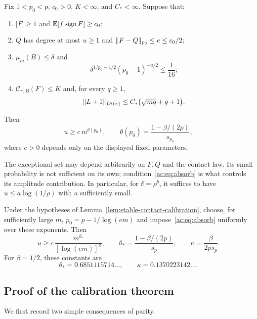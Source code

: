 \begin{lemma}\label{lem:stable-contact-calibration}
Fix $1<p_0<p$, $c_0>0$, $K<\infty$, and $C_*<\infty$. Suppose that:
\begin{enumerate}
\item $|F|\ge1$ and $\mathbb E[f\operatorname{sign} F]\ge c_0$;
\item $Q$ has degree at most $u\ge1$ and $\lVert F-Q\rVert_{p_0}\le e\le c_0/2$;
\item $\mu_m(B)\le\delta$ and
\begin{equation}\label{ac:eq:absorb}
 \delta^{1/p_0-1/2}(p_0-1)^{-u/2}\le\frac1{16};
\end{equation}
\item $\mathcal C_{\pi,B}(F)\le K$ and, for every $q\ge1$,
\begin{equation}\label{ac:eq:distance}
 \lVert L+1\rVert_{L^q(\pi)}\le C_*\bigl(\sqrt{mq}+q+1\bigr).
\end{equation}
\end{enumerate}
Then
\begin{equation}\label{ac:eq:theta}
 u\ge c\,m^{\theta(p_0)},\qquad
 \theta(p_0)=\frac{1-\beta/(2p)}{s_{p_0}},
\end{equation}
where $c>0$ depends only on the displayed fixed parameters.
\end{lemma}

The exceptional set may depend arbitrarily on $F,Q$ and the contact law. Its small probability is not sufficient on its own; condition~\eqref{ac:eq:absorb} is what controls its amplitude contribution. In particular, for $\delta=\rho^b$, it suffices to have $u\le a\log(1/\rho)$ with $a$ sufficiently small.

\begin{theorem}\label{thm:endpoint-contact-calibration}
Under the hypotheses of Lemma~\ref{lem:stable-contact-calibration}, choose, for sufficiently large $m$,
$p_0=p-1/\log(em)$ and impose~\eqref{ac:eq:absorb} uniformly over these exponents. Then
\begin{equation}\label{ac:eq:endpoint}
 u\ge c\,\frac{m^{\theta_*}}{[\log(em)]^\kappa},\qquad
 \theta_* = \frac{1-\beta/(2p)}{s_p},\qquad
 \kappa=\frac{\beta}{2p s_p}.
\end{equation}
For $\beta=1/2$, these constants are
\[
 \theta_*=0.6851115714\ldots,\qquad
 \kappa=0.1370223142\ldots.
\]
\end{theorem}

\subsection{Proof of the calibration theorem}
We first record two simple consequences of parity.

